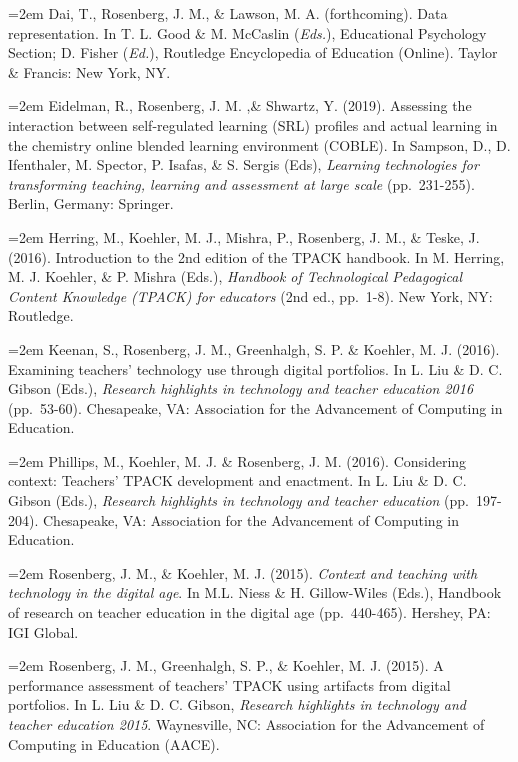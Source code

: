 \documentclass[14,]{article}
\begin{document}
\hangindent=2em Dai, T., Rosenberg, J. M., \& Lawson, M. A.
(forthcoming). Data representation. In T. L. Good \& M. McCaslin
(\emph{Eds.}), Educational Psychology Section; D. Fisher (\emph{Ed.}),
Routledge Encyclopedia of Education (Online). Taylor \& Francis: New
York, NY.

\hangindent=2em Eidelman, R., Rosenberg, J. M. ,\& Shwartz, Y. (2019).
Assessing the interaction between self-regulated learning (SRL) profiles
and actual learning in the chemistry online blended learning environment
(COBLE). In Sampson, D., D. Ifenthaler, M. Spector, P. Isafas, \& S.
Sergis (Eds), \emph{Learning technologies for transforming teaching,
learning and assessment at large scale} (pp.~231-255). Berlin, Germany:
Springer.

\hangindent=2em Herring, M., Koehler, M. J., Mishra, P., Rosenberg, J.
M., \& Teske, J. (2016). Introduction to the 2nd edition of the TPACK
handbook. In M. Herring, M. J. Koehler, \& P. Mishra (Eds.),
\emph{Handbook of Technological Pedagogical Content Knowledge (TPACK)
for educators} (2nd ed., pp.~1-8). New York, NY: Routledge.

\hangindent=2em Keenan, S., Rosenberg, J. M., Greenhalgh, S. P. \&
Koehler, M. J. (2016). Examining teachers' technology use through
digital portfolios. In L. Liu \& D. C. Gibson (Eds.), \emph{Research
highlights in technology and teacher education 2016} (pp.~53-60).
Chesapeake, VA: Association for the Advancement of Computing in
Education.

\hangindent=2em Phillips, M., Koehler, M. J. \& Rosenberg, J. M. (2016).
Considering context: Teachers' TPACK development and enactment. In L.
Liu \& D. C. Gibson (Eds.), \emph{Research highlights in technology and
teacher education} (pp.~197-204). Chesapeake, VA: Association for the
Advancement of Computing in Education.

\hangindent=2em Rosenberg, J. M., \& Koehler, M. J. (2015).
\emph{Context and teaching with technology in the digital age}. In M.L.
Niess \& H. Gillow-Wiles (Eds.), Handbook of research on teacher
education in the digital age (pp.~440-465). Hershey, PA: IGI Global.

\hangindent=2em Rosenberg, J. M., Greenhalgh, S. P., \& Koehler, M. J.
(2015). A performance assessment of teachers' TPACK using artifacts from
digital portfolios. In L. Liu \& D. C. Gibson, \emph{Research highlights
in technology and teacher education 2015}. Waynesville, NC: Association
for the Advancement of Computing in Education (AACE).
\end{document}
